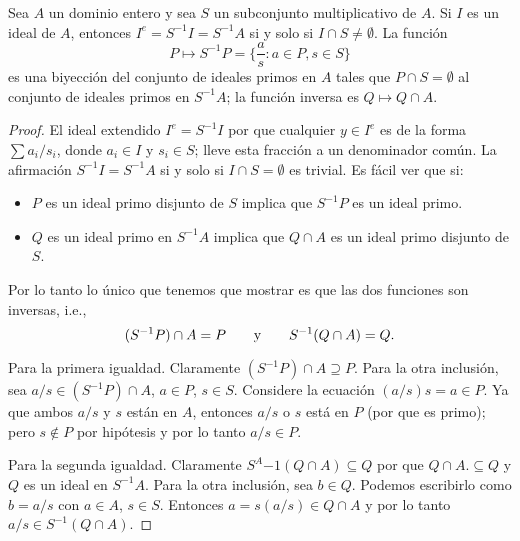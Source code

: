 \begin{proposition}
  Sea $A$ un dominio entero y sea $S$ un subconjunto multiplicativo de $A$. Si $I$ es un ideal de $A$, entonces $I^{e} = S^{-1} I = S^{-1}A$ si y solo si $I \cap S \neq \emptyset$. La función
  \[
    P \mapsto S^{-1}P = \{\frac{a}{s} : a \in P, s \in S\}
  \]
  es una biyección del conjunto de ideales primos en $A$ tales que $P \cap S = \emptyset$ al conjunto de ideales primos en $S^{-1}A$; la función inversa es $Q \mapsto Q \cap A$.
\end{proposition}
\begin{proof}
  El ideal extendido $I^e = S^{-1}I$ por que cualquier $y \in I^e$ es de la forma $\sum a_i/s_i$, donde $a_i \in I$ y $s_i \in S$; lleve esta fracción a un denominador común. La afirmación $S^{-1} I = S^{-1}A$ si y solo si $I \cap S = \emptyset$ es trivial. Es fácil ver que si:
  \begin{itemize}
    \item $P$ es un ideal primo disjunto de $S$ implica que $S^{-1}P$ es un ideal primo.
    \item $Q$ es un ideal primo en $S^{-1}A$ implica que $Q \cap A$ es un ideal primo disjunto de $S$.
  \end{itemize}

  Por lo tanto lo único que tenemos que mostrar es que las dos funciones son inversas, i.e., 
  \[
    (S^{-1}P) \cap A = P
      \qquad\text{y}\qquad
    S^{-1}(Q \cap A) = Q.
  \]

  Para la primera igualdad. Claramente $(S^{-1}P) \cap A \supseteq P$. Para la otra inclusión, sea $a/s \in (S^{-1}P) \cap A$, $a\in P$, $s \in S$. Considere la ecuación $(a/s)s = a \in P$. Ya que ambos $a/s$ y $s$ están en $A$, entonces $a/s$ o $s$ está en $P$ (por que es primo); pero $s \notin P$ por hipótesis y por lo tanto $a/s \in P$.

  Para la segunda igualdad. Claramente $S^A{-1}(Q \cap A) \subseteq Q$ por que $Q \cap A .\subseteq Q$ y $Q$ es un ideal en $S^{-1}A$. Para la otra inclusión, sea $b \in Q$. Podemos escribirlo como $b = a/s$ con $a \in A$, $s \in S$. Entonces $a = s(a/s) \in Q \cap A$ y por lo tanto $a/s \in S^{-1}(Q \cap A)$.
\end{proof}

